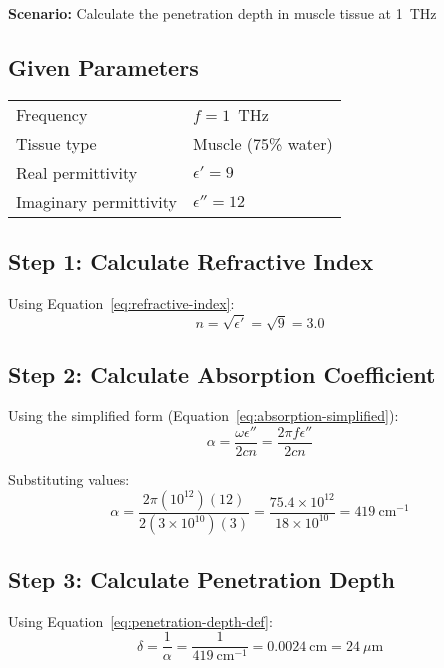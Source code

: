 \textbf{Scenario:} Calculate the penetration depth in muscle tissue at 1~THz

\subsection*{Given Parameters}

\begin{tabular}{@{}ll@{}}
Frequency & $f = 1$~THz \\
Tissue type & Muscle (75\% water) \\
Real permittivity & $\epsilon' = 9$ \\
Imaginary permittivity & $\epsilon'' = 12$ \\
\end{tabular}

\subsection*{Step 1: Calculate Refractive Index}

Using Equation~\ref{eq:refractive-index}:
\begin{equation}
n = \sqrt{\epsilon'} = \sqrt{9} = 3.0
\end{equation}

\subsection*{Step 2: Calculate Absorption Coefficient}

Using the simplified form (Equation~\ref{eq:absorption-simplified}):
\begin{equation}
\alpha = \frac{\omega \epsilon''}{2cn} = \frac{2\pi f \epsilon''}{2cn}
\end{equation}

Substituting values:
\begin{equation}
\alpha = \frac{2\pi (10^{12}) (12)}{2 (3 \times 10^{10}) (3)} = \frac{75.4 \times 10^{12}}{18 \times 10^{10}} = 419~\text{cm}^{-1}
\end{equation}

\subsection*{Step 3: Calculate Penetration Depth}

Using Equation~\ref{eq:penetration-depth-def}:
\begin{equation}
\delta = \frac{1}{\alpha} = \frac{1}{419~\text{cm}^{-1}} = 0.0024~\text{cm} = 24~\mu\text{m}
\end{equation}

